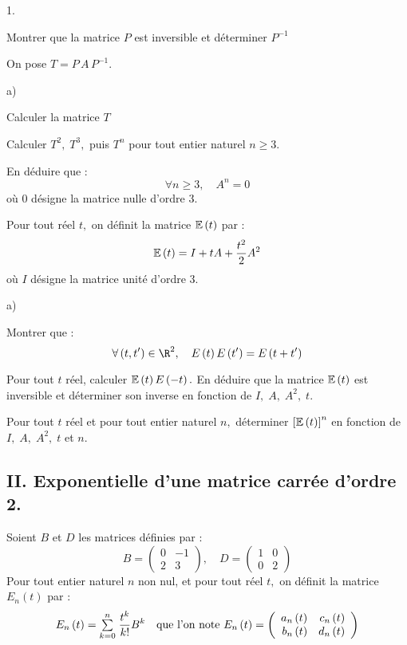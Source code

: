 \documentclass[11pt]{article}%
\begin{document}
\begin{noliste}{1.}
 \setlength{\itemsep}{4mm}
\item Montrer que la matrice $P$ est inversible et déterminer $P^{-1}$

\item On pose $T = P\,A\,P^{-1}.$

\begin{noliste}{a)}
 \setlength{\itemsep}{2mm}
\item Calculer la matrice $T$

\item Calculer $T^{2},\;T^{3},$ puis $T^{n}$ pour tout entier naturel
$n\geq 3.$
\end{noliste}

\item En déduire que : 
\[
\forall n\geq 3,\quad A^{n} = 0
\]
où $0$ désigne la matrice nulle d'ordre 3.

\item Pour tout réel $t,$ on définit la matrice $\mathbb{E}\left( t\right) $
par : 
\[
\mathbb{E}\left( t\right) = I + tA + \frac{t^{2}}{2}A^{2}
\]
où $I$ désigne la matrice unité d'ordre 3.

\begin{noliste}{a)}
 \setlength{\itemsep}{2mm}
\item Montrer que : 
\[
\forall \left( t,t^{\prime }\right) \in \R^{2},\quad E\left(
t\right) E\left( t^{\prime }\right) = E\left( t + t^{\prime }\right) 
\]

\item Pour tout $t$ réel, calculer $\mathbb{E}\left( t\right) E\left(
-t\right).$ En
déduire que la matrice $\mathbb{E}\left( t\right) $ est inversible et
déterminer son
inverse en fonction de $I,\;A,\;A^{2},\;t$.

\item Pour tout $t$ réel et pour tout entier naturel $n,$ déterminer
$\left[
\mathbb{E}\left( t\right) \right] ^{n}$ en fonction de $I,\;A,\;A^{2},\;t$ et
$n.$
\end{noliste}
\end{noliste}

\subsection*{II. Exponentielle d'une matrice carrée d'ordre 2.}

Soient $B$ et $D$ les matrices définies par : 
\[
B = \left( 
\begin{array}{rr}
0 & -1 \\
2 & 3
\end{array}
\right),\quad D = \left( 
\begin{array}{rr}
1 & 0 \\
0 & 2
\end{array}
\right) 
\]
Pour tout entier naturel $n$ non nul, et pour tout réel $t,$ on définit
la
matrice $E_{n}\left( t\right) $ par : 
\[
E_{n}\left( t\right) = {\textstyle\sum\limits_{k = 0}^{n}}\hspace{.1cm}\frac{t^{k}}{k!}B^{k}\quad
\text{que
l'on note }E_{n}\left( t\right) = \left( 
\begin{array}{rr}
a_{n}\left( t\right) & c_{n}\left( t\right) \\
b_{n}\left( t\right) & d_{n}\left( t\right) 
\end{array}
\right) 
\]
\end{document}
